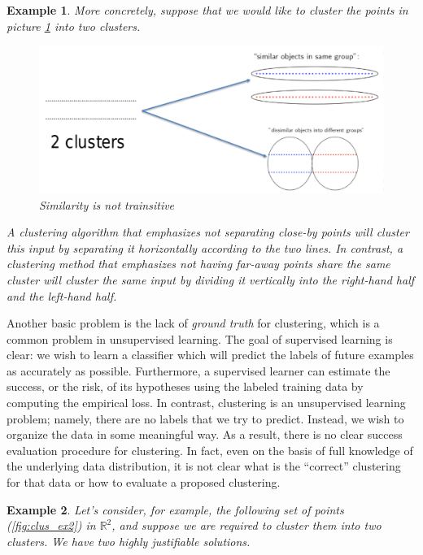 \documentclass[12pt]{report}
\theoremstyle{plain}
\newtheorem{example}{Example}[chapter]
\begin{document}
\begin{flushleft}
\begin{example}
More concretely, suppose that we would like to cluster the points in picture \ref{fig:clus_ex1} into two clusters.
\begin{figure}[!h]
	\centering
	\includegraphics[scale=0.35]{images/clus_ex1.pdf}
	\caption{Similarity is not trainsitive}
	\label{fig:clus_ex1}
\end{figure}
A clustering algorithm that emphasizes not separating close-by points will cluster this input by separating it horizontally according to the two lines. In contrast, a clustering method that emphasizes not having far-away points share the same cluster will cluster the same input by dividing it vertically into the right-hand half and the
left-hand half.
\end{example}
Another basic problem is the lack of \textit{ground truth} for clustering, which is a
common problem in unsupervised learning. The goal of supervised learning is clear: we wish to learn a classifier which will predict the labels of future examples as accurately as possible. Furthermore, a supervised learner can estimate the success, or the risk, of its hypotheses using the labeled training data by computing the empirical loss. In contrast, clustering is an unsupervised learning problem; namely, there are no labels that we try to predict. Instead, we wish to organize the data in some meaningful way. As a result, there is no clear success evaluation procedure for clustering. In fact, even on the basis of full knowledge of the underlying data distribution, it is not clear what is the “correct” clustering for that data or how to evaluate a proposed clustering.
\begin{example}
	Let's consider, for example, the following set of points (\ref{fig:clus_ex2}) in $\mathds{R}^2$, and suppose we are required to cluster them into two clusters. We have two highly	justifiable solutions.
	\begin{figure}[!h]
		\centering

\end{figure}
\end{example}
\end{flushleft}
\end{document}
